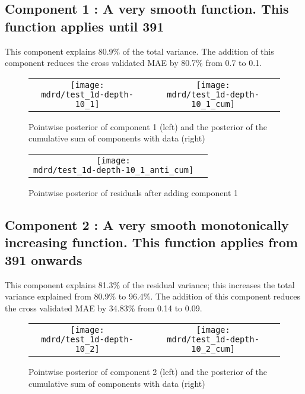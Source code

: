 \documentclass{article} %
\begin{document}
\subsection{Component 1 : A very smooth function. This function applies until  391}



This component explains 80.9\% of the total variance.
The addition of this component reduces the cross validated MAE by 80.7\% from 0.7 to 0.1.


\begin{figure}[H]
\newcommand{\wmgd}{0.5\columnwidth}
\newcommand{\hmgd}{3.0cm}
\newcommand{\mdrd}{test_1d-depth-10}
\newcommand{\mbm}{\hspace{-0.3cm}}
\begin{tabular}{cc}
\mbm \texttt{[image: \\mdrd/test\_1d-depth-10\_1]} & \texttt{[image: \\mdrd/test\_1d-depth-10\_1\_cum]}
\end{tabular}
\caption{Pointwise posterior of component 1 (left) and the posterior of the cumulative sum of components with data (right)}
\label{fig:comp1}
\end{figure}

\begin{figure}[H]
\newcommand{\wmgd}{0.5\columnwidth}
\newcommand{\hmgd}{3.0cm}
\newcommand{\mdrd}{test_1d-depth-10}
\newcommand{\mbm}{\hspace{-0.3cm}}
\begin{tabular}{cc}
\mbm \texttt{[image: \\mdrd/test\_1d-depth-10\_1\_anti\_cum]}
\end{tabular}
\caption{Pointwise posterior of residuals after adding component 1}
\label{fig:comp1}
\end{figure}

\subsection{Component 2 : A very smooth monotonically increasing function. This function applies from  391 onwards}



This component explains 81.3\% of the residual variance; this increases the total variance explained from 80.9\% to 96.4\%.
The addition of this component reduces the cross validated MAE by 34.83\% from 0.14 to 0.09.


\begin{figure}[H]
\newcommand{\wmgd}{0.5\columnwidth}
\newcommand{\hmgd}{3.0cm}
\newcommand{\mdrd}{test_1d-depth-10}
\newcommand{\mbm}{\hspace{-0.3cm}}
\begin{tabular}{cc}
\mbm \texttt{[image: \\mdrd/test\_1d-depth-10\_2]} & \texttt{[image: \\mdrd/test\_1d-depth-10\_2\_cum]}
\end{tabular}
\caption{Pointwise posterior of component 2 (left) and the posterior of the cumulative sum of components with data (right)}
\label{fig:comp2}
\end{figure}
\end{document}
